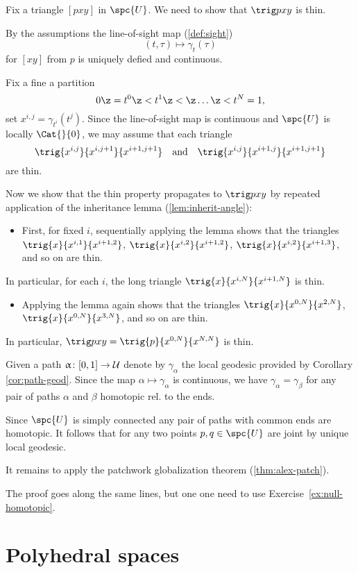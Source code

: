 Fix a triangle $[p x y]$  in $\spc{U}$. 
We need to show that $\trig p x y$ is thin.

By the assumptions the line-of-sight map (\ref{def:sight}) 
\[(t,\tau)\mapsto\gamma_t(\tau)\]
for  $[x y]$ from $p$ is uniquely defied and continuous.    

Fix a fine a partition \[0\z=t^0\z<t^1\z<\z\dots\z<t^N=1,\] 
set $x^{i,j}=\gamma_{t^i}(t^j)$. 
Since the line-of-sight map is continuous and $\spc{U}$ is locally $\Cat{}{0}$, we may assume that each triangle 
\[\trig{x^{i,j}}{x^{i,j+1}}{x^{i+1,j+1}}\quad\text{and}\quad\trig{x^{i,j}}{x^{i+1,j}}{x^{i+1,j+1}}\] 
are thin.

Now we show that the thin property propagates to $\trig p x y$ by repeated application of the inheritance lemma (\ref{lem:inherit-angle}):
\begin{itemize}
\item 
First, for fixed $i$, 
sequentially applying the lemma shows  that the triangles 
$\trig{x}{x^{i,1}}{x^{i+1,2}}$, 
$\trig{x}{x^{i,2}}{x^{i+1,2}}$, 
$\trig{x}{x^{i,2}}{x^{i+1,3}}$,
and so on are thin. 
\end{itemize}
In particular, for each $i$, the long triangle $\trig{x}{x^{i,N}}{x^{i+1,N}}$ is thin.
\begin{itemize} 
\item 
Applying the lemma again shows that the  triangles $\trig{x}{x^{0,N}}{x^{2,N}}$, $\trig{x}{x^{0,N}}{x^{3,N}}$, and so on are thin. 
\end{itemize}
In particular, $\trig p x y=\trig{p}{x^{0,N}}{x^{N,N}}$ is thin.
\qeds

Given a path $\alpha\:[0,1]\to\spc{U}$ denote by $\gamma_\alpha$ the local geodesic provided by Corollary \ref{cor:path-geod}.
Since the map $\alpha\mapsto\gamma_\alpha$ is continuous,
we have $\gamma_\alpha=\gamma_\beta$ for any pair of  paths $\alpha$ and $\beta$  homotopic rel. to the ends.

Since $\spc{U}$ is simply connected any pair of paths with common ends are homotopic.
It follows that for any two points $p,q\in\spc{U}$ are joint by unique local geodesic.

It remains to apply the patchwork globalization theorem (\ref{thm:alex-patch}).

The proof goes along the same lines, 
but one one need to use Exercise~\ref{ex:null-homotopic}. \qeds


\section{Polyhedral spaces}

